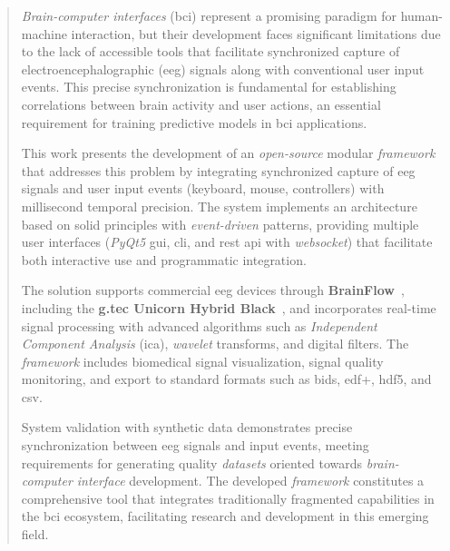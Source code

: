 \begin{abstract}
  \vspace*{25pt}
  \begin{segundoresumo}
    \textit{Brain-computer interfaces} (\acrshort{bci}) represent a promising paradigm for human-machine interaction, but their development faces significant limitations due to the lack of accessible tools that facilitate synchronized capture of electroencephalographic (\acrshort{eeg}) signals along with conventional user input events. This precise synchronization is fundamental for establishing correlations between brain activity and user actions, an essential requirement for training predictive models in \acrshort{bci} applications.

    This work presents the development of an \textit{open-source} modular \textit{framework} that addresses this problem by integrating synchronized capture of \acrshort{eeg} signals and user input events (keyboard, mouse, controllers) with millisecond temporal precision. The system implements an architecture based on \acrshort{solid} principles with \textit{event-driven} patterns, providing multiple user interfaces (\textit{PyQt5} \acrshort{gui}, \acrshort{cli}, and \acrshort{rest} \acrshort{api} with \textit{\gls{websocket}}) that facilitate both interactive use and programmatic integration.

    The solution supports commercial \acrshort{eeg} devices through \textbf{BrainFlow}~\cite{brainflow}, including the \textbf{g.tec Unicorn Hybrid Black}~\cite{gtec_unicorn}, and incorporates real-time signal processing with advanced algorithms such as \textit{Independent Component Analysis} (\acrshort{ica}), \textit{wavelet} transforms, and digital filters. The \textit{framework} includes biomedical signal visualization, signal quality monitoring, and export to standard formats such as \acrshort{bids}, \acrshort{edf}+, \acrshort{hdf5}, and \acrshort{csv}.

    System validation with synthetic data demonstrates precise synchronization between \acrshort{eeg} signals and input events, meeting requirements for generating quality \textit{datasets} oriented towards \textit{brain-computer interface} development. The developed \textit{framework} constitutes a comprehensive tool that integrates traditionally fragmented capabilities in the \acrshort{bci} ecosystem, facilitating research and development in this emerging field.
  \end{segundoresumo}
\vspace*{25pt}

\end{abstract}
\pagestyle{fancy}

